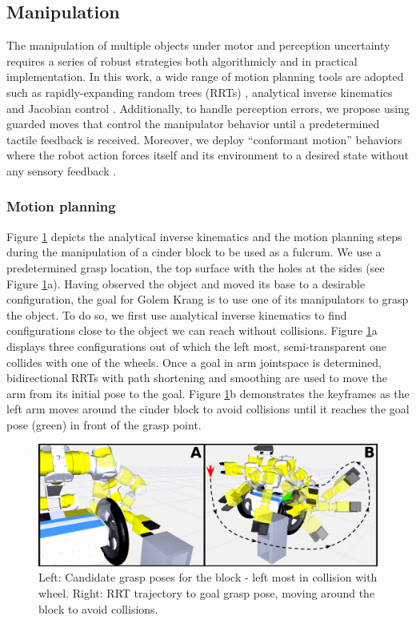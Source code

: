 \documentclass[runningheads,a4paper]{llncs}
\begin{document}
\subsection{Manipulation}

The manipulation of multiple objects under motor and perception uncertainty requires a series of 
robust strategies both algorithmicly and in practical implementation. In this work, a wide range of
motion planning tools are adopted such as rapidly-expanding random trees (RRTs) \cite{kuffner2000rrt},
analytical inverse kinematics \cite{tolani2000real} and Jacobian control \cite{whitney1969resolved}. 
Additionally, to handle perception errors, we propose using guarded moves \cite{bejczy1977effect} 
that control the manipulator behavior until a predetermined tactile feedback is received. Moreover,
we deploy ``conformant motion'' behaviors where the robot action forces itself
and its environment to a desired state without any sensory feedback \cite{goldman1996expressive}. 
% 
\subsubsection{Motion planning}

Figure \ref{fig:manipulation} depicts the analytical inverse kinematics and the motion planning
steps during the manipulation of a cinder block to be used as a fulcrum. We use a predetermined
grasp location, the top surface with the holes at the sides (see Figure \ref{fig:manipulation}a).
Having observed the object and moved its base to a desirable configuration, the goal for Golem
Krang is to use one of its manipulators to grasp the object. To do so, we first use analytical
inverse kinematics to find configurations close to the object we can reach without collisions.
Figure \ref{fig:manipulation}a displays three configurations out of which the left most,
semi-transparent one collides with one of the wheels. Once a goal in arm jointspace is determined,
bidirectional RRTs with path shortening and smoothing are used to move the arm from its initial 
pose to the goal. Figure \ref{fig:manipulation}b demonstrates the keyframes as the left arm moves
around the cinder block to avoid collisions until it reaches the goal pose (green) in front of the grasp point. 

\begin{figure}[ht!] 
  \centering
  \includegraphics[width=1.0\linewidth]{Figures/manipulation.png}
  \caption{Left: Candidate grasp poses for the block - left most in collision with wheel.
  Right: RRT trajectory to goal grasp pose, moving around the block to avoid collisions.}
  \label{fig:manipulation}
\end{figure}
\end{document}
